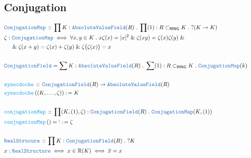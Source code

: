 \documentclass[12pt]{scrartcl}
\newcommand{\TYPE}[1]{\textcolor{NavyBlue}{\mathtt{#1}}}
\newcommand{\FUNC}[1]{\textcolor{Cerulean}{\mathtt{#1}}}
\renewcommand{\.}{\; . \;}
\newcommand{\de}{: \kern 0.1pc =}
\newcommand{\Act}[1]{\left( #1 \right)}
\newcommand{\DeclareType}[2]{& \TYPE{#1} \, :: \, #2 \\}
\newcommand{\DefineType}[3]{& #1 : \TYPE{#2} \iff #3 \\}
\newcommand{\DefineNamedType}[4]{& #1 : \TYPE{#2} \iff #3 \iff #4 \\}
\newcommand{\DeclareFunc}[2]{& \FUNC{#1} \, :: \, #2 \\}
\newcommand{\DefineFunc}[3]{&  \FUNC{#1}\Act{#2} \de #3 \\}
\newcommand{\DefineNamedFunc}[4]{&  \FUNC{#1}\Act{#2} = #3 \de #4 \\}
\newcommand{\NewLine}{\\ & \kern 1pc}
\newcommand{\Page}[1]{ \begin{align*} #1 \end{align*}   }
\renewcommand{\And}{\; \& \;}
\newcommand{\Reals}{\mathbb{R} }
\begin{document}
\subsection{Conjugation}
\Page{
	\DeclareType{ConjugationMap}{\prod K : \TYPE{AbsoluteValueField}(R) \. 
		\prod (1) : R \subset_{\mathsf{RING}} K \. 
		?(K \to K)
	}
\DefineType{\zeta}{ConjugationMap}{ \forall x,y \in K \.  x\zeta(x) = |x|^2 
\And  \zeta(xy) = \zeta(x)\zeta(y) 
\And \NewLine \And  \zeta(x + y) = \zeta(x) + \zeta(y) 
\And  \zeta\big( \zeta(x) \big) = x
}
\\
& \TYPE{ConjugationField} = \sum K : \TYPE{AbsoluteValueField}(R) \. \sum (1) : R \subset_{\mathsf{RING}} K \. 
 \TYPE{ConjugationMap}(k) \\
 \\
\DeclareFunc{synecdoche}{ \TYPE{ConjugationField}(R) \to \TYPE{AbsoluteValueField}(R) }
\DefineFunc{synecdoche}{(K,\ldots,\zeta)}{K}
\\
\DeclareFunc{conjugationMap }{ \prod (K, (1),\zeta) :  \TYPE{ConjugationField}(R) \. \TYPE{ConjugationMap}(K,(1))}
\DefineNamedFunc{conjugationMap}{}{\overline{\cdot}}{\zeta}
\\
\DeclareType{RealStrucure}{ \prod K : \TYPE{ConjugationField}(R) \. ?K  }
\DefineNamedType{x}{RealStructure}{ x \in \Reals (K) }{ \overline{x} = x  }
}
\end{document}
